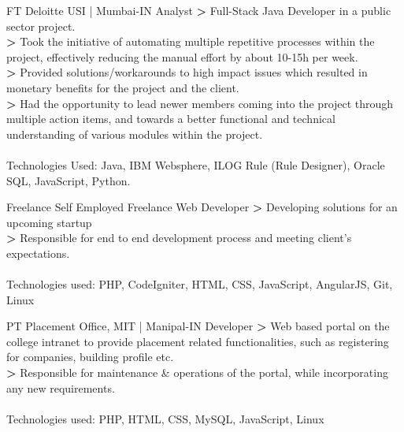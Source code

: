 \documentclass[10pt]{article} %
\begin{document}
\begin{paracol}{2}


{FT} %
{Deloitte USI | Mumbai-IN} %
{Analyst} %
{
\textbf{>} Full-Stack Java Developer in a public sector project.\\
\textbf{>} Took the initiative of automating multiple repetitive processes within the project, effectively reducing the manual effort by about 10-15h per week.\\
\textbf{>} Provided solutions/workarounds to high impact issues which resulted in monetary benefits for the project and the client.\\
\textbf{>} Had the opportunity to lead newer members coming into the project through multiple action items, and towards a better functional and technical understanding of various modules within the project.\\
\\
Technologies Used: Java, IBM Websphere, ILOG Rule (Rule Designer), Oracle SQL, JavaScript, Python.
} %


{Freelance} %
{Self Employed} %
{Freelance Web Developer} %
{
\textbf{>} Developing solutions for an upcoming startup\\
\textbf{>} Responsible for end to end development process and meeting client's expectations.\\
\\
Technologies used: PHP, CodeIgniter, HTML, CSS, JavaScript, AngularJS, Git, Linux
} %


{PT} %
{Placement Office, MIT | Manipal-IN} %
{Developer} %
{
\textbf{>} Web based portal on the college intranet to provide placement related functionalities, such as registering for companies, building profile etc.\\
\textbf{>} Responsible for maintenance & operations of the portal, while incorporating any new requirements.\\
\\
Technologies used: PHP, HTML, CSS, MySQL, JavaScript, Linux
} %


\end{paracol}
\end{document}

